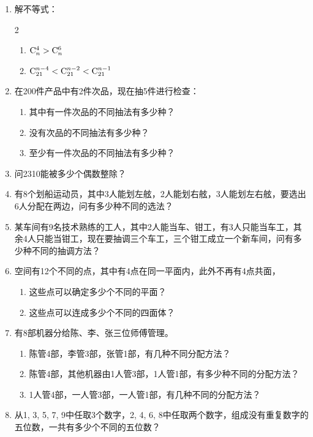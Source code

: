 \begin{enumerate}
\item 解不等式：
\begin{multicols}{2}
\begin{enumerate}[(1)]
    \item ${\rm C}^{4}_{n}>{\rm C}^{6}_{n}$
    \item ${\rm C}^{n-4}_{21}<{\rm C}^{n-2}_{21}<{\rm C}^{n-1}_{21}$
\end{enumerate}
\end{multicols}

\item 在200件产品中有2件次品，现在抽5件进行检查：
\begin{enumerate}[(1)]
\item 其中有一件次品的不同抽法有多少种？
\item 没有次品的不同抽法有多少种？
\item 至少有一件次品的不同抽法有多少种？
\end{enumerate}

\item 问2310能被多少个偶数整除？
\item 有8个划船运动员，其中3人能划左舷，2人能划右舷，3人能划左右舷，要选出6人分配在两边，问有多少种不同的选法？

\item  某车间有9名技术熟练的工人，其中2人能当车、钳工，有3人只能当车工，其余4人只能当钳工，现在要抽调三个车工，三个钳工成立一个新车间，问有多少种不同的抽调方法？
\item  空间有12个不同的点，其中有4点在同一平面内，此外不再有4点共面，
\begin{enumerate}[(1)]
\item  这些点可以确定多少个不同的平面？
\item  这些点可以连成多少个不同的四面体？
\end{enumerate}

\item  有8部机器分给陈、李、张三位师傅管理。
\begin{enumerate}[(1)]
\item 陈管4部，李管3部，张管1部，有几种不同分配方法？
\item 陈管4部，其他机器由1人管3部，1人管1部，有多少种不同的分配方法？
\item 1人管4部，一人管3部，一人管1部，有几种不同的分配方法？
\end{enumerate}

\item  从1, 3, 5, 7, 9中任取3个数字，2, 4, 6, 8中任取两个数字，组成没有重复数字的五位数，一共有多少个不同的五位数？
\end{enumerate}

